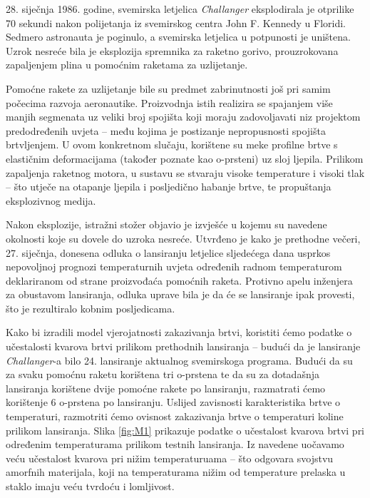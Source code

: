 \documentclass[a4paper,12pt,oneside]{memoir}
\begin{document}
            28. siječnja 1986. godine, svemirska letjelica \textit{Challanger} eksplodirala je otprilike 70 sekundi nakon polijetanja iz svemirskog centra John F. Kennedy u Floridi. Sedmero astronauta je poginulo, a svemirska letjelica u potpunosti je uništena. Uzrok nesreće bila je eksplozija spremnika za raketno gorivo, prouzrokovana zapaljenjem plina u pomoćnim raketama za uzlijetanje.

            Pomoćne rakete za uzlijetanje bile su predmet zabrinutnosti još pri samim počecima razvoja aeronautike. Proizvodnja istih realizira se spajanjem više manjih segmenata uz veliki broj spojišta koji moraju zadovoljavati niz projektom predodređenih uvjeta -- među kojima je postizanje nepropusnosti spojišta brtvljenjem. U ovom konkretnom slučaju, korištene su meke profilne brtve s elastičnim deformacijama (također poznate kao o-prsteni) uz sloj ljepila. Prilikom zapaljenja raketnog motora, u sustavu se stvaraju visoke temperature i visoki tlak -- što utječe na otapanje ljepila i posljedično habanje brtve, te propuštanja eksplozivnog medija.

            Nakon eksplozije, istražni stožer objavio je izvješće u kojemu su navedene okolnosti koje su dovele do uzroka nesreće. Utvrđeno je kako je prethodne večeri, 27. siječnja, donesena odluka o lansiranju letjelice sljedećega dana usprkos nepovoljnoj prognozi temperaturnih uvjeta određenih radnom temperaturom deklariranom od strane proizvođaća pomoćnih raketa. Protivno apelu inženjera za obustavom lansiranja, odluka uprave bila je da će se lansiranje ipak provesti, što je rezultiralo kobnim posljedicama.


            Kako bi izradili model vjerojatnosti zakazivanja brtvi, koristiti ćemo podatke o učestalosti kvarova brtvi prilikom prethodnih lansiranja -- budući da je lansiranje \textit{Challanger}-a bilo 24. lansiranje aktualnog svemirskoga programa. Budući da su za svaku pomoćnu raketu korištena tri o-prstena te da su za dotadašnja lansiranja korištene dvije pomoćne rakete po lansiranju, razmatrati ćemo korištenje 6 o-prstena po lansiranju. Uslijed zavisnosti karakteristika brtve o temperaturi, razmotriti ćemo ovisnost zakazivanja brtve o temperaturi koline prilikom lansiranja. Slika \ref{fig:M1} prikazuje podatke o učestalost kvarova brtvi pri određenim temperaturama prilikom testnih lansiranja. Iz navedene uočavamo veću učestalost kvarova pri nižim temperaturuama -- što odgovara svojstvu amorfnih materijala, koji na temperaturama nižim od temperature prelaska u staklo imaju veću tvrdoću i lomljivost.
\end{document}
